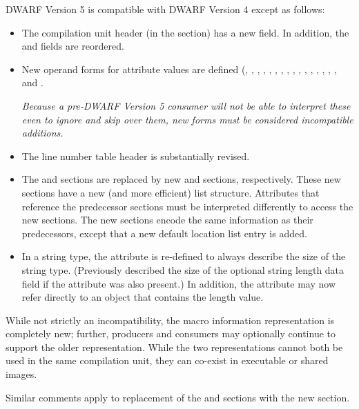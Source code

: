 DWARF Version 5 is compatible with DWARF Version 4 except as follows:
\begin{itemize}
\item The compilation unit header (in the \dotdebuginfo{} section) has
a new \HFNunittype{} field.
In addition, the \HFNdebugabbrevoffset{} and \HFNaddresssize{} fields are reordered.
\item New operand forms for attribute values are defined
(\DWFORMaddrxNAME,
\DWFORMaddrxoneNAME, \DWFORMaddrxtwoNAME, \DWFORMaddrxthreeNAME, \DWFORMaddrxfourNAME,
\DWFORMdatasixteenNAME, \DWFORMimplicitconstNAME,
\DWFORMlinestrpNAME,
\DWFORMloclistxNAME, \DWFORMrnglistxNAME,
\DWFORMrefsupfourNAME, \DWFORMrefsupeightNAME,
\DWFORMstrpsupNAME, \DWFORMstrxNAME,
\DWFORMstrxoneNAME, \DWFORMstrxtwoNAME, \DWFORMstrxthreeNAME{} and \DWFORMstrxfourNAME.

\textit{Because a pre-DWARF Version 5 consumer will not be able to interpret
these even to ignore and skip over them, new forms must be
considered incompatible additions.}
\item The line number table header is substantially revised.
\item
The \dotdebugloc{} and \dotdebugranges{} sections are replaced
by new \dotdebugloclists{} and \dotdebugrnglists{} sections, respectively.
These new sections have a new (and more efficient) list structure.
Attributes that reference the predecessor sections must be interpreted
differently to access the new sections. The new sections encode the same
information as their predecessors, except that a new default location
list entry is added.
\item In a string type, the \DWATbytesizeNAME{} attribute is re-defined
to always describe the size of the string type.
(Previously
\bb
\DWATbytesizeNAME{}
\eb
described the size of the optional string length data
field if the \DWATstringlengthNAME{} attribute was also present.)
In addition, the \DWATstringlengthNAME{} attribute may now refer directly
to an object that contains the length value.
\end{itemize}

While not strictly an incompatibility, the macro information
representation is completely new; further, producers
and consumers may optionally continue to support the older
representation. While the two representations cannot both be
used in the same compilation unit, they can co-exist in
executable or shared images.

Similar comments apply to replacement of the \dotdebugpubnames{}
and \dotdebugpubtypes{} sections with the new \dotdebugnames{}
section.

